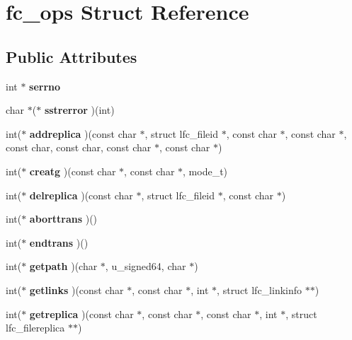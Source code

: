 \section{fc\_\-ops Struct Reference}
\label{structfc__ops}
\subsection*{Public Attributes}
\begin{DoxyCompactItemize}
\item 
int $\ast$ {\bfseries serrno}\label{structfc__ops_acfb288671b9efed97e26a011a480403a}

\item 
char $\ast$($\ast$ {\bfseries sstrerror} )(int)\label{structfc__ops_aa34fe06b6e6adf09256cd676ba473b4d}

\item 
int($\ast$ {\bfseries addreplica} )(const char $\ast$, struct lfc\_\-fileid $\ast$, const char $\ast$, const char $\ast$, const char, const char, const char $\ast$, const char $\ast$)\label{structfc__ops_a41069006ef629a0222c08d4575268db1}

\item 
int($\ast$ {\bfseries creatg} )(const char $\ast$, const char $\ast$, mode\_\-t)\label{structfc__ops_a16561ee9622104bb8fcae39ebe978555}

\item 
int($\ast$ {\bfseries delreplica} )(const char $\ast$, struct lfc\_\-fileid $\ast$, const char $\ast$)\label{structfc__ops_aaabb48a8af8720a9ecc347df672a60d1}

\item 
int($\ast$ {\bfseries aborttrans} )()\label{structfc__ops_a95f694c455133d325d1cd4b14831fef9}

\item 
int($\ast$ {\bfseries endtrans} )()\label{structfc__ops_abe1b3852adfdcbb4acc9b0c0d8314b85}

\item 
int($\ast$ {\bfseries getpath} )(char $\ast$, u\_\-signed64, char $\ast$)\label{structfc__ops_a3ae16843070a02df05928576c47bd6cd}

\item 
int($\ast$ {\bfseries getlinks} )(const char $\ast$, const char $\ast$, int $\ast$, struct lfc\_\-linkinfo $\ast$$\ast$)\label{structfc__ops_aacb2338b16985c2c6434056622da8e41}

\item 
int($\ast$ {\bfseries getreplica} )(const char $\ast$, const char $\ast$, const char $\ast$, int $\ast$, struct lfc\_\-filereplica $\ast$$\ast$)\label{structfc__ops_a019ab27d7bf96839d88e309f781894df}


\end{DoxyCompactItemize}
